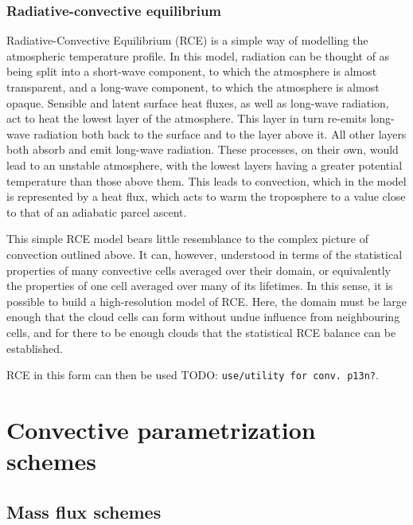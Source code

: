 \documentclass[11pt,a4paper]{article}
\newcommand{\todo}{TODO: \texttt}
\begin{document}
\subsubsection{Radiative-convective equilibrium}

Radiative-Convective Equilibrium (RCE) is a simple way of modelling the atmospheric temperature profile. In this model, radiation can be thought of as being split into a short-wave component, to which the atmosphere is almost transparent, and a long-wave component, to which the atmosphere is almost opaque. Sensible and latent surface heat fluxes, as well as long-wave radiation, act to heat the lowest layer of the atmosphere. This layer in turn re-emits long-wave radiation both back to the surface and to the layer above it. All other layers both absorb and emit long-wave radiation. These processes, on their own, would lead to an unstable atmosphere, with the lowest layers having a greater potential temperature than those above them. This leads to convection, which in the model is represented by a heat flux, which acts to warm the troposphere to a value close to that of an adiabatic parcel ascent.

This simple RCE model bears little resemblance to the complex picture of convection outlined above. It can, however, understood in terms of the statistical properties of many convective cells averaged over their domain, or equivalently the properties of one cell averaged over many of its lifetimes. In this sense, it is possible to build a high-resolution model of RCE. Here, the domain must be large enough that the cloud cells can form without undue influence from neighbouring cells, and for there to be enough clouds that the statistical RCE balance can be established. 

RCE in this form can then be used \todo{use/utility for conv. p13n?}.

\section{Convective parametrization schemes}


\subsection{Mass flux schemes}
\label{sec:mass_flux_schemes}
\end{document}
